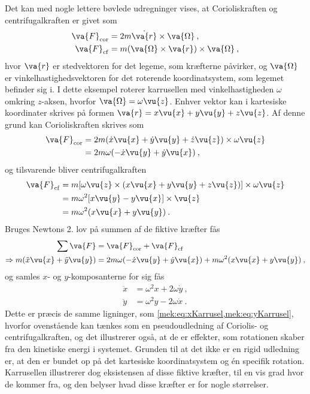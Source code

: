 \noindent
Det kan med nogle lettere bøvlede udregninger vises, at Corioliskraften og centrifugalkraften er givet som
%
\begin{equation} \label{mek:eq:FiktiveKraefter}
\begin{aligned}
	\va{F}_\mathrm{cor} &= 2m\dot{\va{r}}\times\va{\Omega} \: , \\
	\va{F}_\mathrm{cf} &= m(\va{\Omega} \times \va{r}) \times \va{\Omega} \: ,
\end{aligned}
\end{equation}
%
hvor $\va{r}$ er stedvektoren for det legeme, som kræfterne påvirker, og $\va{\Omega}$ er vinkelhastighedsvektoren for det roterende koordinatsystem, som legemet befinder sig i. I dette eksempel roterer karrusellen med vinkelhastigheden $\omega$ omkring $z$-aksen, hvorfor $\va{\Omega} = \omega\vu{z}$. Enhver vektor kan i kartesiske koordinater skrives på formen $\va{r} = x\vu{x} + y\vu{y} + z\vu{z}$. Af denne grund kan Corioliskraften skrives som
%
\begin{equation}
\begin{aligned}
	\va{F}_\mathrm{cor} &= 2m(\dot{x}\vu{x} + \dot{y}\vu{y} + \dot{z}\vu{z}) \times \omega\vu{z} \\
	&= 2m\omega(-\dot{x}\vu{y} + \dot{y}\vu{x}) \: ,
\end{aligned}
\end{equation}
%
og tilsvarende bliver centrifugalkraften
%
\begin{equation}
\begin{aligned}
	\va{F}_\mathrm{cf} &= m[\omega\vu{z} \times (x\vu{x} + y\vu{y} + z\vu{z})] \times \omega\vu{z} \\
	&= m\omega^2[x\vu{y} - y\vu{x}] \times \vu{z} \\
	&= m\omega^2(x\vu{x} + y\vu{y}) \: .
\end{aligned}
\end{equation}
%
Bruges Newtons 2. lov på summen af de fiktive kræfter fås
\begin{align}
	\sum\va{F} &= \va{F}_\mathrm{cor} + \va{F}_\mathrm{cf} \nonumber\\
	\Rightarrow m(\ddot{x}\vu{x} + \ddot{y}\vu{y}) &= 2m\omega(-\dot{x}\vu{y} + \dot{y}\vu{x}) + m\omega^2(x\vu{x} + y\vu{y}) \: ,
\end{align}
%
og samles $x$- og $y$-komposanterne for sig fås
%
\begin{equation}
	\begin{aligned}
		\ddot{x} &= \omega^2x + 2\omega\dot{y} \: , \\
		\ddot{y} &= \omega^2y - 2\omega\dot{x} \: .
	\end{aligned}
\end{equation}
%
Dette er præcis de samme ligninger, som \cref{mek:eq:xKarrusel,mek:eq:yKarrusel}, hvorfor ovenstående kan tænkes som en pseudoudledning af Coriolis- og centrifugalkraften, og det illustrerer også, at de er effekter, som rotationen skaber fra den kinetiske energi i systemet. Grunden til at det ikke er en rigid udledning er, at den er bundet op på det kartesiske koordinatsystem og én specifik rotation. Karrusellen illustrerer dog eksistensen af disse fiktive kræfter, til en vis grad hvor de kommer fra, og den belyser hvad disse kræfter er for nogle størrelser.
